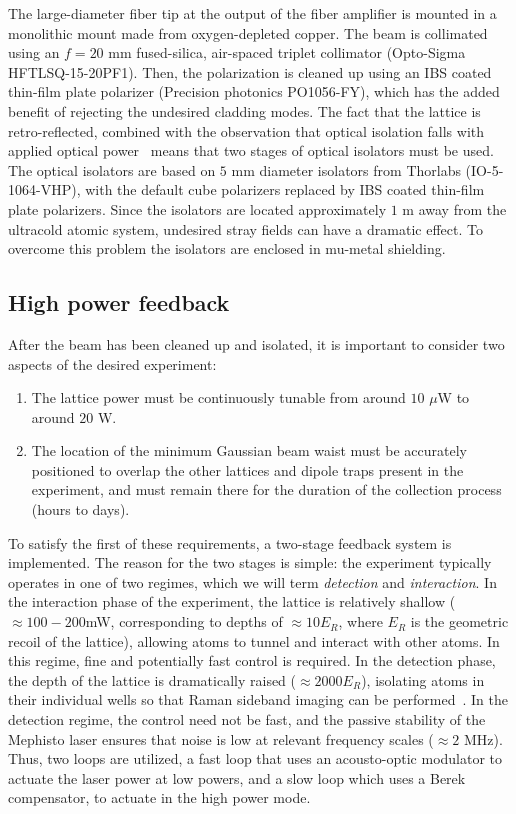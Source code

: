 \documentclass[twocolumn,aps,pra,showpacs,preprintnumbers,bibnotes]{revtex4-1}
\begin{document}
The large-diameter fiber tip at the output of the fiber amplifier is mounted in a monolithic mount made from oxygen-depleted copper.
The beam is collimated using an $f=20$ mm fused-silica, air-spaced triplet collimator (Opto-Sigma HFTLSQ-15-20PF1).
Then, the polarization is cleaned up using an IBS coated thin-film plate polarizer (Precision photonics PO1056-FY), which has the added benefit of rejecting the undesired cladding modes. 
The fact that the lattice is retro-reflected, combined with the observation that optical isolation falls with applied optical power~\cite{Yoshida1999} means that two stages of optical isolators must be used. 
The optical isolators are based on $5$ mm diameter isolators from Thorlabs (IO-5-1064-VHP), with the default cube polarizers replaced by IBS coated thin-film plate polarizers. 
Since the isolators are located approximately $1$ m away from the ultracold atomic system, undesired stray fields can have a dramatic effect.
To overcome this problem the isolators are enclosed in mu-metal shielding.

\subsection{High power feedback}

After the beam has been cleaned up and isolated, it is important to consider two aspects of the desired experiment: 
\begin{enumerate}
\item The lattice power must be continuously tunable from around $10$ $\mu$W to around $20$ W. 
\item The location of the minimum Gaussian beam waist must be accurately positioned to overlap the other lattices and dipole traps present in the experiment, and must remain there for the duration of the collection process (hours to days).
\end{enumerate}
To satisfy the first of these requirements, a two-stage feedback system is implemented. The reason for the two stages is simple: the experiment typically operates in one of two regimes, which we will term \textit{detection} and \textit{interaction}. 
In the interaction phase of the experiment, the lattice is relatively shallow ($\approx 100-200$mW, corresponding to depths of $\approx 10 E_R$, where $E_R$ is the geometric recoil of the lattice), allowing atoms to tunnel and interact with other atoms. 
In this regime, fine and potentially fast control is required.
In the detection phase, the depth of the lattice is dramatically raised ($\approx 2000 E_R$), isolating atoms in their individual wells so that Raman sideband imaging can be performed~\cite{Parsons2015}.
In the detection regime, the control need not be fast, and the passive stability of the Mephisto laser ensures that noise is low at relevant frequency scales ($\approx 2$ MHz).
Thus, two loops are utilized, a fast loop that uses an acousto-optic modulator to actuate the laser power at low powers, and a slow loop which uses a Berek compensator, to actuate in the high power mode.
\end{document}
